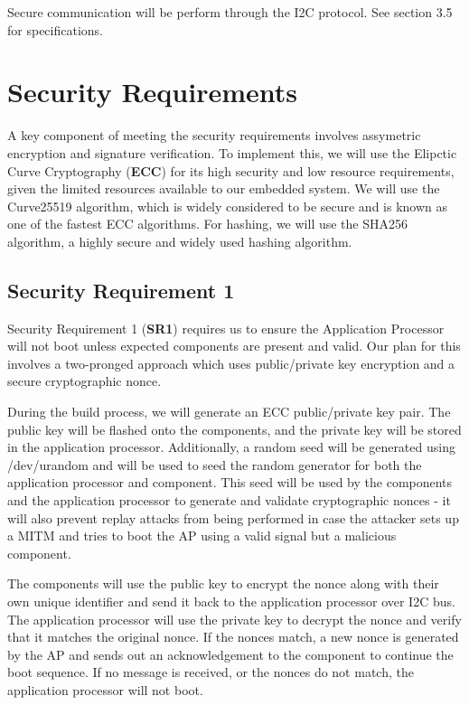 \documentclass{prace}
\begin{document}
Secure communication will be perform through the I2C protocol. See section 3.5 for specifications.

\section{Security Requirements}

A key component of meeting the security requirements involves assymetric encryption and signature
verification. To implement this, we will use the Elipctic Curve Cryptography (\textbf{ECC}) for
its high security and low resource requirements, given the limited resources available to our
embedded system. We will use the Curve25519 algorithm, which is widely considered to be secure
and is known as one of the fastest ECC algorithms. For hashing, we will use the SHA256 algorithm,
a highly secure and widely used hashing algorithm.

\subsection{Security Requirement 1}
Security Requirement 1 (\textbf{SR1}) requires us to ensure the Application Processor will not boot unless
expected components are present and valid. Our plan for this involves a two-pronged approach
which uses public/private key encryption and a secure cryptographic nonce.

During the build process, we will generate an ECC public/private key pair. The public key will be
flashed onto the components, and the private key will be stored in the application processor.
Additionally, a random seed will be generated using /dev/urandom and will be used to seed the
random generator for both the application processor and component. This seed will be used by the components and the application processor to generate
and validate cryptographic nonces - it will also prevent replay attacks from being performed in case the attacker sets up a MITM and tries to boot the AP using a valid signal but a malicious component.

The components will use the public key to encrypt the nonce along with their own
unique identifier and send it back to the application processor over I2C bus. The application
processor will use the private key to decrypt the nonce and verify that it matches the original
nonce. If the nonces match, a new nonce is generated by the AP and sends out an acknowledgement to the component to continue the boot sequence. If no message is received, or the nonces do not match, the application
processor will not boot.
\end{document}
